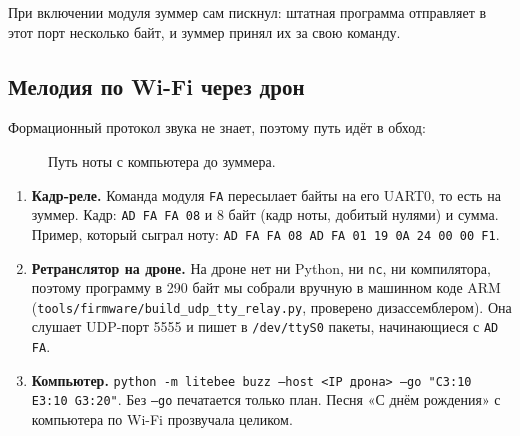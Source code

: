 При включении модуля зуммер сам пискнул: штатная программа отправляет в этот порт несколько байт, и зуммер принял их за свою команду. \pr{}

\subsection*{Мелодия по Wi-Fi через дрон}

Формационный протокол звука не знает, поэтому путь идёт в обход:

\begin{figure}[tbp]
\centering
{}
\caption{Путь ноты с компьютера до зуммера.}\label{fig:buzzpath}
\end{figure}

\begin{enumerate}
  \item \textbf{Кадр-реле.} Команда модуля \texttt{FA} пересылает байты на его UART0, то есть на зуммер. Кадр: \texttt{AD FA FA 08} и 8 байт (кадр ноты, добитый нулями) и сумма. Пример, который сыграл ноту: \texttt{AD FA FA 08 AD FA 01 19 0A 24 00 00 F1}. \pr{}
  \item \textbf{Ретранслятор на дроне.} На дроне нет ни Python, ни \texttt{nc}, ни компилятора, поэтому программу в 290 байт мы собрали вручную в машинном коде ARM (\texttt{tools/firmware/build\_udp\_tty\_relay.py}, проверено дизассемблером). Она слушает UDP-порт 5555 и пишет в \texttt{/dev/ttyS0} пакеты, начинающиеся с \texttt{AD FA}. \pr{}
  \item \textbf{Компьютер.} \texttt{python -m litebee buzz --host <IP дрона> --go "C3:10 E3:10 G3:20"}. Без \texttt{--go} печатается только план. Песня «С днём рождения» с компьютера по Wi-Fi прозвучала целиком. \pr{}
\end{enumerate}

